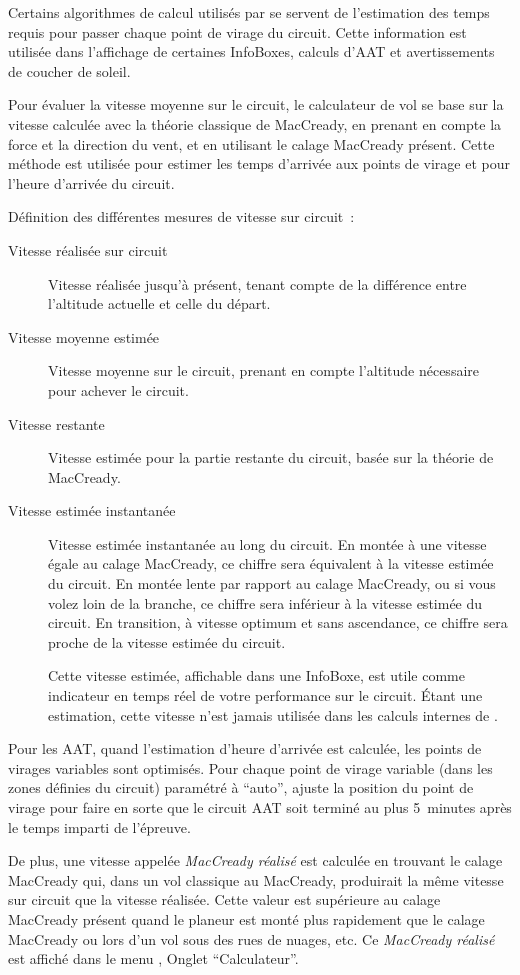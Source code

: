 Certains algorithmes de calcul utilisés par \xc{} se servent de l'estimation des temps requis pour passer chaque point de virage du circuit.
Cette information est utilisée dans l'affichage de certaines InfoBoxes, calculs d'AAT et avertissements de coucher de soleil.

Pour évaluer la vitesse moyenne sur le circuit, le calculateur de vol se base sur la vitesse calculée avec la théorie classique de MacCready, en prenant en compte la force et la direction du vent, et en utilisant le calage MacCready présent.
Cette méthode est utilisée pour estimer les temps d'arrivée aux points de virage et pour l'heure d'arrivée du circuit.

Définition des différentes mesures de vitesse sur circuit~:
\begin{description}
\item[Vitesse réalisée sur circuit] Vitesse réalisée jusqu'à présent, tenant compte de la différence entre l'altitude actuelle et celle du départ.
\item[Vitesse moyenne estimée] Vitesse moyenne sur le circuit, prenant en compte l'altitude nécessaire pour achever le circuit.
\item[Vitesse restante] Vitesse estimée pour la partie restante du circuit, basée sur la théorie de MacCready.
\item[Vitesse estimée instantanée] Vitesse estimée instantanée au long du circuit.
En montée à une vitesse égale au calage MacCready, ce chiffre sera équivalent à la vitesse estimée du circuit.
En montée lente par rapport au calage MacCready, ou si vous volez loin de la branche, ce chiffre sera inférieur à la vitesse estimée du circuit.
En transition, à vitesse optimum et sans ascendance, ce chiffre sera proche de la vitesse estimée du circuit.

Cette vitesse estimée, affichable dans une InfoBoxe, est utile comme indicateur en temps réel de votre performance sur le circuit.
Étant une estimation, cette vitesse n'est jamais utilisée dans les calculs internes de \xc.
\end{description}

Pour les AAT, quand l'estimation d'heure d'arrivée est calculée, les points de virages variables sont optimisés.
\tip{} Pour chaque point de virage variable (dans les zones définies du circuit) paramétré à ``auto'', \xc{} ajuste la position du point de virage pour faire en sorte que le circuit AAT soit terminé au plus 5~minutes après le temps imparti de l'épreuve.

De plus, une vitesse appelée \emph{MacCready réalisé} est calculée en trouvant le calage MacCready qui, dans un vol classique au MacCready, produirait la même vitesse sur circuit que la vitesse réalisée.
Cette valeur est supérieure au calage MacCready présent quand le planeur est monté plus rapidement que le calage MacCready ou lors d'un vol sous des rues de nuages, etc.
Ce \emph{MacCready réalisé} est affiché dans le menu \blink{}, Onglet ``Calculateur''.

